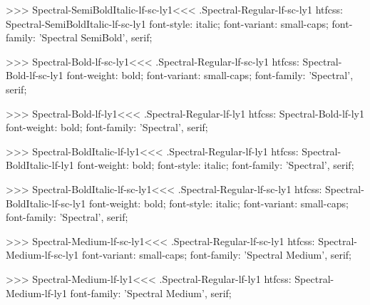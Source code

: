 >>>
\<Spectral-SemiBoldItalic-lf-sc-ly1\><<<
.Spectral-Regular-lf-sc-ly1
htfcss:  Spectral-SemiBoldItalic-lf-sc-ly1  font-style: italic; font-variant: small-caps; font-family: 'Spectral SemiBold', serif;

>>>
\<Spectral-Bold-lf-sc-ly1\><<<
.Spectral-Regular-lf-sc-ly1
htfcss:  Spectral-Bold-lf-sc-ly1  font-weight: bold; font-variant: small-caps; font-family: 'Spectral', serif;

>>>
\<Spectral-Bold-lf-ly1\><<<
.Spectral-Regular-lf-ly1
htfcss:  Spectral-Bold-lf-ly1  font-weight: bold; font-family: 'Spectral', serif;

>>>
\<Spectral-BoldItalic-lf-ly1\><<<
.Spectral-Regular-lf-ly1
htfcss:  Spectral-BoldItalic-lf-ly1  font-weight: bold; font-style: italic; font-family: 'Spectral', serif;

>>>
\<Spectral-BoldItalic-lf-sc-ly1\><<<
.Spectral-Regular-lf-sc-ly1
htfcss:  Spectral-BoldItalic-lf-sc-ly1  font-weight: bold; font-style: italic; font-variant: small-caps; font-family: 'Spectral', serif;

>>>
\<Spectral-Medium-lf-sc-ly1\><<<
.Spectral-Regular-lf-sc-ly1
htfcss:  Spectral-Medium-lf-sc-ly1  font-variant: small-caps; font-family: 'Spectral Medium', serif;

>>>
\<Spectral-Medium-lf-ly1\><<<
.Spectral-Regular-lf-ly1
htfcss:  Spectral-Medium-lf-ly1  font-family: 'Spectral Medium', serif;


